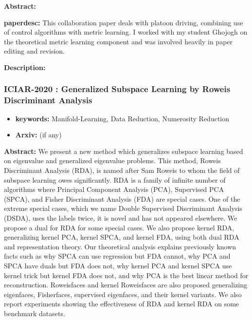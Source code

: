 \documentclass{article}
\begin{document}
\textbf{Abstract:} 

\textbf{paperdesc:} This collaboration paper deals with platoon driving, combining use of control algorithms with metric learning. I worked with my student Ghojogh on the theoretical metric learning component and was involved heavily in paper editing and revision.

\textbf{Description:} 



\newpage
\subsubsection{\textbf{ICIAR-2020} : Generalized Subspace Learning by Roweis Discriminant Analysis}
\begin{itemize}
\item \textbf{keywords:} Manifold-Learning, Data Reduction, Numerosity Reduction
\item \textbf{Arxiv:}  (if any)
\end{itemize}


\textbf{Abstract:} We present a new method which generalizes subspace learning based on eigenvalue and generalized eigenvalue problems. This method, Roweis Discriminant Analysis (RDA), is named after Sam Roweis to whom the field of subspace learning owes significantly. RDA is a family of infinite number of algorithms where Principal Component Analysis (PCA), Supervised PCA (SPCA), and Fisher Discriminant Analysis (FDA) are special cases. One of the extreme special cases, which we name Double Supervised Discriminant Analysis (DSDA), uses the labels twice, it is novel and has not appeared elsewhere. We propose a dual for RDA for some special cases. We also propose kernel RDA, generalizing kernel PCA, kernel SPCA, and kernel FDA, using both dual RDA and representation theory. Our theoretical analysis explains previously known facts such as why SPCA can use regression but FDA cannot, why PCA and SPCA have duals but FDA does not, why kernel PCA and kernel SPCA use kernel trick but kernel FDA does not, and why PCA is the best linear method for reconstruction. Roweisfaces and kernel Roweisfaces are also proposed generalizing eigenfaces, Fisherfaces, supervised eigenfaces, and their kernel variants. We also report experiments showing the effectiveness of RDA and kernel RDA on some benchmark datasets.
\end{document}
